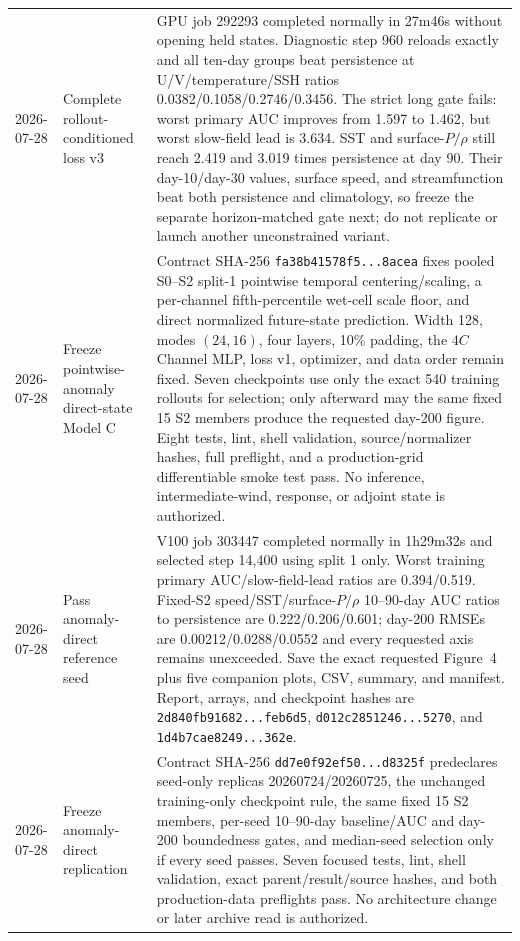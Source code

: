\documentclass[11pt]{article}
\begin{document}
\begin{longtable}{@{}p{}p{}p{}@{}}
2026-07-28 & Complete rollout-conditioned loss v3 & GPU job 292293 completed normally in 27m46s without opening held states.  Diagnostic step 960 reloads exactly and all ten-day groups beat persistence at U/V/temperature/SSH ratios 0.0382/0.1058/0.2746/0.3456.  The strict long gate fails: worst primary AUC improves from 1.597 to 1.462, but worst slow-field lead is 3.634.  SST and surface-\(P/\rho\) still reach 2.419 and 3.019 times persistence at day 90.  Their day-10/day-30 values, surface speed, and streamfunction beat both persistence and climatology, so freeze the separate horizon-matched gate next; do not replicate or launch another unconstrained variant. \\
2026-07-28 & Freeze pointwise-anomaly direct-state Model C & Contract SHA-256 \texttt{fa38b41578f5...8acea} fixes pooled S0--S2 split-1 pointwise temporal centering/scaling, a per-channel fifth-percentile wet-cell scale floor, and direct normalized future-state prediction.  Width 128, modes \((24,16)\), four layers, 10\% padding, the \(4C\) Channel MLP, loss v1, optimizer, and data order remain fixed.  Seven checkpoints use only the exact 540 training rollouts for selection; only afterward may the same fixed 15 S2 members produce the requested day-200 figure.  Eight tests, lint, shell validation, source/normalizer hashes, full preflight, and a production-grid differentiable smoke test pass.  No inference, intermediate-wind, response, or adjoint state is authorized. \\
2026-07-28 & Pass anomaly-direct reference seed & V100 job 303447 completed normally in 1h29m32s and selected step 14,400 using split 1 only.  Worst training primary AUC/slow-field-lead ratios are 0.394/0.519.  Fixed-S2 speed/SST/surface-\(P/\rho\) 10--90-day AUC ratios to persistence are 0.222/0.206/0.601; day-200 RMSEs are 0.00212/0.0288/0.0552 and every requested axis remains unexceeded.  Save the exact requested Figure~4 plus five companion plots, CSV, summary, and manifest.  Report, arrays, and checkpoint hashes are \texttt{2d840fb91682...feb6d5}, \texttt{d012c2851246...5270}, and \texttt{1d4b7cae8249...362e}. \\
2026-07-28 & Freeze anomaly-direct replication & Contract SHA-256 \texttt{dd7e0f92ef50...d8325f} predeclares seed-only replicas 20260724/20260725, the unchanged training-only checkpoint rule, the same fixed 15 S2 members, per-seed 10--90-day baseline/AUC and day-200 boundedness gates, and median-seed selection only if every seed passes.  Seven focused tests, lint, shell validation, exact parent/result/source hashes, and both production-data preflights pass.  No architecture change or later archive read is authorized. \\

\end{longtable}
\end{document}
